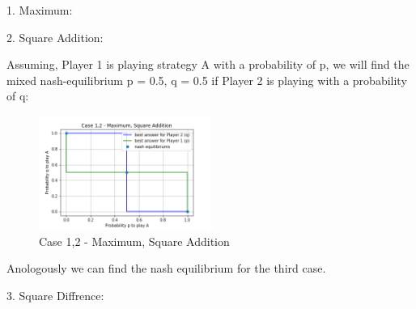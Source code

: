 1. Maximum:
\begin{table}[h]
\end{table}

2. Square Addition:
\begin{table}[h]
\end{table}

Assuming, Player 1 is playing strategy A with a probability of p, we will find the mixed nash-equilibrium p = 0.5, q = 0.5 if Player 2 is playing with a probability of q:

\begin{figure}[!ht]
    \centering
    \includegraphics[width=0.5\textwidth]{Bilder/5_max}
    \caption{Case 1,2 - Maximum, Square Addition}
    \label{fig:meine-grafik}
\end{figure}

Anologously we can find the nash equilibrium for the third case.

3. Square Diffrence:

